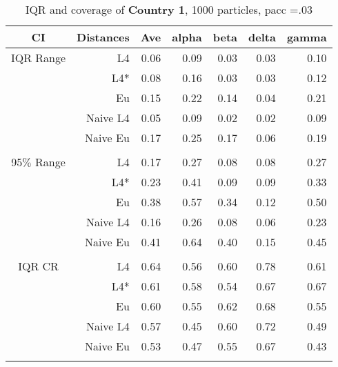 \documentclass[a4paper,12pt,twoside]{book}
\begin{document}
\begin{table}[H]
\centering
\caption{IQR and coverage of \textbf{Country 1}, 1000 particles, pacc =.03}

\begin{tabular}{crrrrrr}
  \hline
{\color{blue}CI} & Distances & Ave & alpha & beta & delta & gamma \\ 
  \hline
{\color{blue}IQR Range} & L4  &0.06 & 0.09 & 0.03 & 0.03 & 0.10 \\ 
  
&L4*  &0.08 & 0.16 & 0.03 & 0.03 & 0.12 \\ 
 
&Eu &     0.15 & 0.22 & 0.14 & 0.04 & 0.21 \\ 
  
&Naive L4&0.05 & 0.09 & 0.02 & 0.02 & 0.09 \\ 
  
&Naive Eu &  0.17 & 0.25 & 0.17 & 0.06 & 0.19 \\ \\
  
    {\color{blue}95$\%$ Range} & L4  &0.17 & 0.27 & 0.08 & 0.08 & 0.27 \\ 
  
    &L4*  & 0.23 & 0.41 & 0.09 & 0.09 & 0.33 \\ 
 
&Eu &   0.38 & 0.57 & 0.34 & 0.12 & 0.50 \\ 
  
&Naive L4&    0.16 & 0.26 & 0.08 & 0.06 & 0.23 \\ 
 
&Naive Eu &   0.41 & 0.64 & 0.40 & 0.15 & 0.45 \\ \\
 
   \hline
   
{\color{blue} IQR CR } & L4  &0.64 & 0.56 & 0.60 & 0.78 & 0.61 \\ 
 

&L4*  &   0.61 & 0.58 & 0.54 & 0.67 & 0.67 \\ 
 
 
&Eu &    0.60 & 0.55 & 0.62 & 0.68 & 0.55 \\ 
  
&Naive L4&  0.57 & 0.45 & 0.60 & 0.72 & 0.49 \\ 
&Naive Eu &  0.53 & 0.47 & 0.55 & 0.67 & 0.43 \\ \\
 


\end{tabular}
\end{table}
\end{document}
